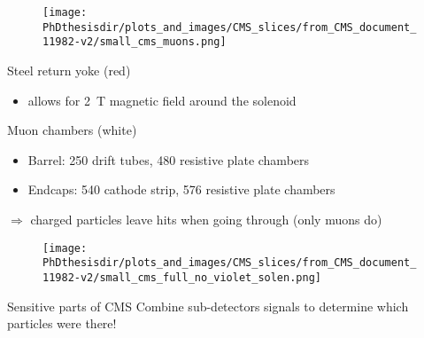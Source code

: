 \begin{frame}
\addtocounter{framenumber}{-1}
\begin{minipage}[t]{.6\textwidth}
\begin{figure}
\texttt{[image: \\PhDthesisdir/plots\_and\_images/CMS\_slices/from\_CMS\_document\_11982-v2/small\_cms\_muons.png]}
\end{figure}
\end{minipage}
\hfill\begin{minipage}[t]{.35\textwidth}
\begin{block}{Steel return yoke (red)}
\begin{itemize}
\item allows for \SI{2}{\tesla} magnetic field around the solenoid
\end{itemize}
\end{block}

\begin{block}{Muon chambers (white)}
\begin{itemize}
\item Barrel: \num{250} drift tubes, \num{480} resistive plate chambers
\item Endcaps: \num{540} cathode strip, \num{576} resistive plate chambers
\end{itemize}
\end{block}

\begin{block}{}
$\Rightarrow$ charged particles leave hits when going through (only muons do)
\end{block}
\vspace{-2\baselineskip}
\end{minipage}
\end{frame}

\begin{frame}
\addtocounter{framenumber}{-1}
\begin{minipage}[t]{.6\textwidth}
\begin{figure}
\texttt{[image: \\PhDthesisdir/plots\_and\_images/CMS\_slices/from\_CMS\_document\_11982-v2/small\_cms\_full\_no\_violet\_solen.png]}
\end{figure}
\end{minipage}
\hfill\begin{minipage}[t]{.35\textwidth}
\begin{block}{Sensitive parts of CMS}
Combine sub-detectors signals to determine which particles were there!
\end{block}
\end{minipage}
\end{frame}